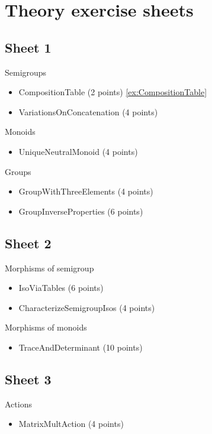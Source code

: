 
\section{Theory exercise sheets}


\subsection{Sheet 1}

Semigroups
\begin{itemize}
\item CompositionTable (2 points) \cref{ex:CompositionTable} 
\item VariationsOnConcatenation (4 points) 
\end{itemize}

Monoids
\begin{itemize}
\item UniqueNeutralMonoid (4 points)
\end{itemize}

Groups
\begin{itemize}
\item GroupWithThreeElements (4 points)
\item GroupInverseProperties (6 points)
\end{itemize}


\subsection{Sheet 2}
Morphisms of semigroup
\begin{itemize}
\item IsoViaTables (6 points)
\item CharacterizeSemigroupIsos (4 points)
\end{itemize}

Morphisms of monoids
\begin{itemize}
\item TraceAndDeterminant (10 points)
\end{itemize}


\subsection{Sheet 3}

Actions
\begin{itemize}
\item MatrixMultAction (4 points)
\end{itemize}


